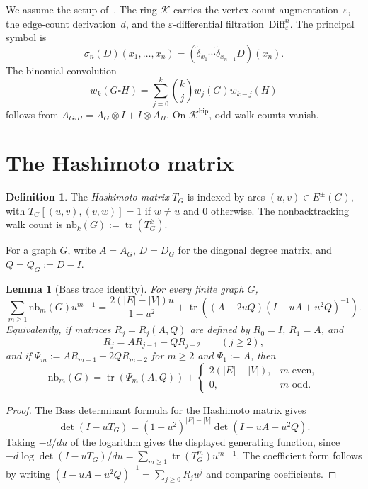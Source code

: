 \documentclass[11pt]{amsart}
\newcommand{\K}{\mathcal{K}}
\newcommand{\tr}{\operatorname{tr}}
\newcommand{\Diff}{\mathrm{Diff}}
\newcommand{\nb}{\mathrm{nb}}
\newtheorem{lemma}[theorem]{Lemma}
\theoremstyle{definition}
\newtheorem{definition}[theorem]{Definition}
\theoremstyle{remark}
\begin{document}
We assume the setup of~\cite{RG}. The ring $\K$ carries the vertex-count augmentation~$\varepsilon$, the edge-count derivation~$d$, and the $\varepsilon$-differential filtration~$\Diff^n_\varepsilon$. The principal symbol is
\[
   \sigma_n(D)(x_1,\ldots,x_n)=(\widetilde\delta_{x_1}\cdots\widetilde\delta_{x_{n-1}}D)(x_n).
\]
The binomial convolution
\begin{equation}\label{eq:walk-binomial}
   w_k(G\square H)=\sum_{j=0}^k \binom{k}{j}w_j(G)w_{k-j}(H)
\end{equation}
follows from $A_{G\square H}=A_G\otimes I+I\otimes A_H$. On $\K^{\mathrm{bip}}$, odd walk counts vanish.

\section{The Hashimoto matrix}

\begin{definition}
The \emph{Hashimoto matrix} $T_G$ is indexed by arcs $(u,v)\in E^{\pm}(G)$, with $T_G[(u,v),(v,w)]=1$ if $w\ne u$ and $0$ otherwise. The nonbacktracking walk count is $\nb_k(G):=\tr(T_G^k)$.
\end{definition}

For a graph $G$, write $A=A_G$, $D=D_G$ for the diagonal degree matrix, and $Q=Q_G:=D-I$.

\begin{lemma}[Bass trace identity]\label{lem:bass-trace}
For every finite graph $G$,
\[
   \sum_{m\ge1}\nb_m(G)u^{m-1}
   = \frac{2(|E|-|V|)u}{1-u^2}
     +\tr\!\left((A-2uQ)(I-uA+u^2Q)^{-1}\right).
\]
Equivalently, if matrices $R_j=R_j(A,Q)$ are defined by $R_0=I$, $R_1=A$, and
\[
   R_j=AR_{j-1}-QR_{j-2}\qquad (j\ge2),
\]
and if $\Psi_m:=AR_{m-1}-2QR_{m-2}$ for $m\ge2$ and $\Psi_1:=A$, then
\begin{equation}\label{eq:bass-trace-coeff}
   \nb_m(G)=\tr(\Psi_m(A,Q)) + \begin{cases}2(|E|-|V|),&m\text{ even},\\0,&m\text{ odd}.\end{cases}
\end{equation}
\end{lemma}

\begin{proof}
The Bass determinant formula for the Hashimoto matrix gives
\[
   \det(I-uT_G)=(1-u^2)^{|E|-|V|}\det(I-uA+u^2Q).
\]
Taking $-d/du$ of the logarithm gives the displayed generating function, since
$-d\log\det(I-uT_G)/du=\sum_{m\ge1}\tr(T_G^m)u^{m-1}$. The coefficient form follows by writing $(I-uA+u^2Q)^{-1}=\sum_{j\ge0}R_j u^j$ and comparing coefficients.
\end{proof}
\end{document}
